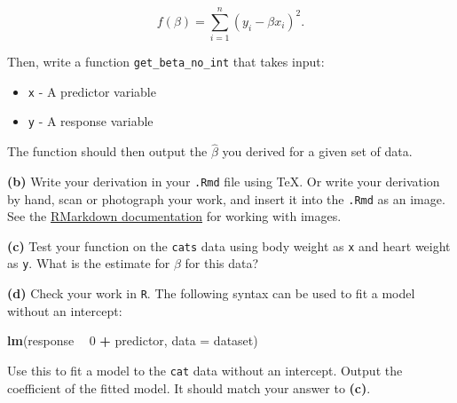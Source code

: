 \documentclass[]{article}
\newenvironment{Shaded}{\begin{snugshade}}{\end{snugshade}}
\newcommand{\DataTypeTok}[1]{\textcolor[rgb]{0.13,0.29,0.53}{#1}}
\newcommand{\DecValTok}[1]{\textcolor[rgb]{0.00,0.00,0.81}{#1}}
\newcommand{\KeywordTok}[1]{\textcolor[rgb]{0.13,0.29,0.53}{\textbf{#1}}}
\newcommand{\NormalTok}[1]{#1}
\newcommand{\OperatorTok}[1]{\textcolor[rgb]{0.81,0.36,0.00}{\textbf{#1}}}
\newcommand{\StringTok}[1]{\textcolor[rgb]{0.31,0.60,0.02}{#1}}
\providecommand{\tightlist}{%
  \setlength{\itemsep}{0pt}\setlength{\parskip}{0pt}}
\begin{document}
\[
f(\beta)=\sum_{i=1}^{n}(y_{i}-\beta x_{i})^{2}.
\]

Then, write a function \texttt{get\_beta\_no\_int} that takes input:

\begin{itemize}
\tightlist
\item
  \texttt{x} - A predictor variable
\item
  \texttt{y} - A response variable
\end{itemize}

The function should then output the \(\hat{\beta}\) you derived for a
given set of data.

\textbf{(b)} Write your derivation in your \texttt{.Rmd} file using TeX.
Or write your derivation by hand, scan or photograph your work, and
insert it into the \texttt{.Rmd} as an image. See the
\href{http://rmarkdown.rstudio.com/}{RMarkdown documentation} for
working with images.

\textbf{(c)} Test your function on the \texttt{cats} data using body
weight as \texttt{x} and heart weight as \texttt{y}. What is the
estimate for \(\beta\) for this data?

\textbf{(d)} Check your work in \texttt{R}. The following syntax can be
used to fit a model without an intercept:

\begin{Shaded}
\begin{Highlighting}[]
\KeywordTok{lm}\NormalTok{(response }\OperatorTok{~}\StringTok{ }\DecValTok{0} \OperatorTok{+}\StringTok{ }\NormalTok{predictor, }\DataTypeTok{data =}\NormalTok{ dataset)}
\end{Highlighting}
\end{Shaded}

Use this to fit a model to the \texttt{cat} data without an intercept.
Output the coefficient of the fitted model. It should match your answer
to \textbf{(c)}.
\end{document}
